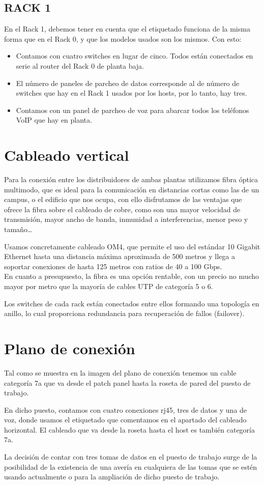 \subsection{RACK 1}
En el Rack 1, debemos tener en cuenta que el etiquetado funciona de la misma forma que en el Rack 0, y que los modelos usados son los mismos.  Con esto:
\begin{itemize}
	\item Contamos con cuatro switches en lugar de cinco. Todos están conectados en serie al router del Rack 0 de planta baja.
	\item El número de paneles de parcheo de datos corresponde al de número de switches que hay en el Rack 1 usados por los hosts, por lo tanto, hay tres.
	\item Contamos con un panel de parcheo de voz para abarcar todos los teléfonos VoIP que hay en planta.
\end{itemize}

\section{Cableado vertical}
Para la conexión entre los distribuidores de ambas plantas utilizamos fibra óptica multimodo, que es ideal para la comunicación en distancias cortas como las de un campus, o el edificio que nos ocupa, con ello disfrutamos de las ventajas que ofrece la fibra sobre el cableado de cobre, como son una mayor velocidad de transmisión, mayor ancho de banda, inmunidad a interferencias, menor peso y tamaño…

Usamos concretamente cableado OM4, que permite el uso del estándar 10 Gigabit Ethernet hasta una distancia máxima aproximada de 500 metros y llega a soportar conexiones de hasta 125 metros con ratios de 40 a 100 Gbps.\\
En cuanto a presupuesto, la fibra es una opción rentable, con un precio no mucho mayor por metro que la mayoría de cables UTP de categoría 5 o 6.

Los switches de cada rack están conectados entre ellos formando una topología en anillo, lo cual proporciona redundancia para recuperación de fallos (failover).

\section{Plano de conexión}
Tal como se muestra en la imagen del plano de conexión tenemos un cable categoría 7a que va desde el patch panel hasta la roseta de pared del puesto de trabajo.

En dicho puesto, contamos con cuatro conexiones rj45, tres de datos y una de voz, donde usamos el etiquetado que comentamos en el apartado del cableado horizontal. El cableado que va desde la roseta hasta el host es también categoría 7a.

La decisión de contar con tres tomas de datos en el puesto de trabajo surge de la posibilidad de la existencia de una avería en cualquiera de las tomas que se estén usando actualmente o para la ampliación de dicho puesto de trabajo.